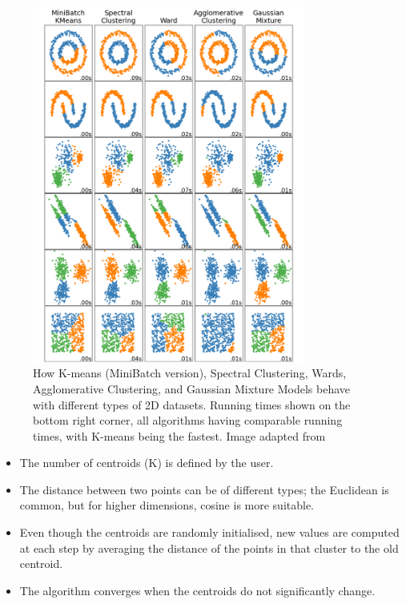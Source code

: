 \begin{figure}[!t]
  \centering
  \includegraphics[width=0.8\textwidth,height=0.5\textheight,keepaspectratio]{Sections/Lit_review/Resources/clustering_scikit.png}
    \caption{How K-means (MiniBatch version), Spectral Clustering, Wards, Agglomerative Clustering, and Gaussian Mixture Models behave with different types of 2D datasets. Running times shown on the bottom right corner, all algorithms having comparable running times, with K-means being the fastest. Image adapted from \cite{Scikit-learn_undated-ax}}
    \label{fig:lit:clustering_types}
\end{figure}

\begin{itemize}
  \item The number of centroids (K) is defined by the user.
  \item The distance between two points can be of different types; the Euclidean is common, but for higher dimensions, cosine is more suitable.
  \item Even though the centroids are randomly initialised, new values are computed at each step by averaging the distance of the points in that cluster to the old centroid.
  \item The algorithm converges when the centroids do not significantly change.
\end{itemize}

